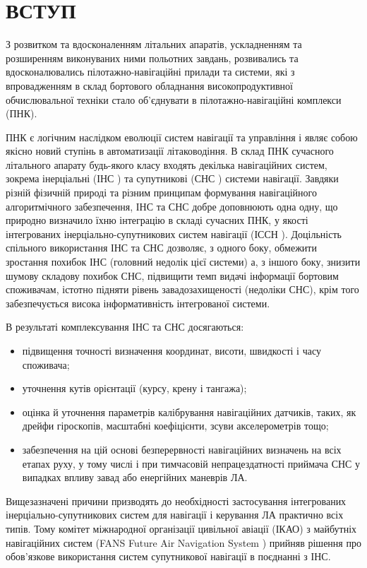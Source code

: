 \section*{ВСТУП}

З розвитком та вдосконаленням літальних апаратів, ускладненням та розширенням 
виконуваних ними польотних завдань, розвивались та вдосконалювались пілотажно-навігаційні 
прилади та системи, які з впровадженням в склад бортового обладнання високопродуктивної 
обчислювальної техніки стало об’єднувати в пілотажно-навігаційні комплекси (ПНК).

ПНК є логічним наслідком еволюції систем навігації та управління і являє собою якісно 
новий ступінь в автоматизації літаководіння. В склад ПНК сучасного літального апарату 
будь-якого класу входять декілька навігаційних систем, зокрема інерціальні 
(ІНС ) та супутникові 
(СНС ) системи навігації. Завдяки різній фізичній природі 
та різним принципам формування навігаційного алгоритмічного забезпечення,  ІНС 
та СНС добре доповнюють одна одну, що природно визначило їхню інтеграцію в 
складі сучасних ПНК, у якості  інтегрованих інерціально-супутникових систем 
навігації (ІССН ). Доцільність спільного використання ІНС та СНС дозволяє, з 
одного боку, обмежити зростання похибок ІНС (головний недолік цієї системи) а, 
з іншого боку, знизити шумову складову похибок СНС, підвищити темп видачі 
інформації бортовим споживачам, істотно підняти рівень завадозахищеності (недоліки СНС), 
крім того забезпечується висока інформативність інтегрованої системи. 

В результаті комплексування ІНС та СНС досягаються:
\begin{itemize}
 \item підвищення точності визначення координат, висоти, швидкості і часу споживача;
 \item уточнення кутів орієнтації (курсу, крену і тангажа); 
 \item оцінка й уточнення параметрів калібрування навігаційних датчиків, таких, як 
дрейфи гіроскопів, масштабні коефіцієнти, зсуви акселерометрів тощо;
 \item забезпечення на цій основі безперервності навігаційних визначень на 
всіх етапах руху, у тому числі і при тимчасовій непрацездатності приймача СНС у 
випадках впливу  завад або енергійних маневрів ЛА.
\end{itemize}
Вищезазначені причини призводять до необхідності застосування інтегрованих 
інерціально-супутникових систем для навігації і керування ЛА практично всіх типів. 
Тому комітет міжнародної організації цивільної авіації (ІКАО) з майбутніх навігаційних 
систем (FANS Future Air Navigation System ) 
прийняв рішення про обов'язкове використання систем супутникової навігації в поєднанні з ІНС.


